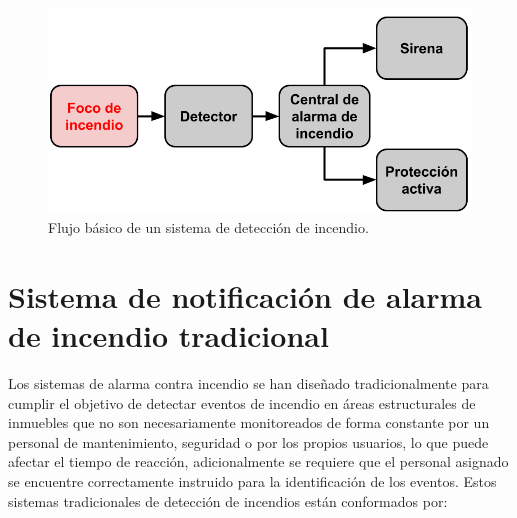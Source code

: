 \begin{figure}[h]
	\centering
	\includegraphics[scale=.4]{./Figures/Capitulo1/FIG_A1.png}
	\caption{Flujo básico de un sistema de detección de incendio.}
	\label{fig:figura_a1}
\end{figure}



\section{Sistema de notificación de alarma de incendio tradicional}

Los sistemas de alarma contra incendio se han diseñado tradicionalmente para cumplir el objetivo de detectar eventos de incendio en áreas estructurales de inmuebles que no son necesariamente monitoreados de forma constante por un personal de mantenimiento, seguridad o por los propios usuarios, lo que puede afectar el tiempo de reacción, adicionalmente se requiere que el personal asignado se encuentre correctamente instruido para la identificación de los eventos. Estos sistemas tradicionales de detección de incendios están conformados por:

